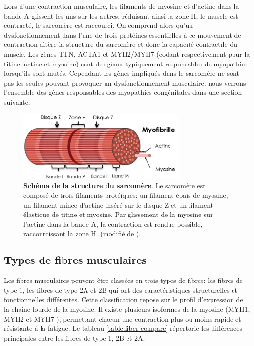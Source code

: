 Lors d'une contraction musculaire, les filaments de myosine et d'actine dans la bande A glissent les uns sur les autres, réduisant ainsi la zone H, le muscle est contracté, le sarcomère est raccourci. On comprend alors qu'un dysfonctionnement dans l'une de trois protéines essentielles à ce mouvement de contraction altère la structure du sarcomère et donc la capacité contractile du muscle. Les gènes TTN, ACTA1 et MYH2/MYH7 (codant respectivement pour la titine, actine et myosine) sont des gènes typiquement responsables de myopathies lorsqu'ils sont mutés. Cependant les gènes impliqués dans le sarcomère ne sont pas les seules pouvant provoquer un dysfonctionnement musculaire, nous verrons l'ensemble des gènes responsables des myopathies congénitales dans une section suivante.

\begin{figure}[htbp]
 \centering
 \includegraphics[width=0.75\textwidth]{figures/sarcomere.png}
 \caption[Schéma de la structure du sarcomère.]{\textbf{Schéma de la structure du sarcomère}. Le sarcomère est composé de trois filaments protéiques: un filament épais de myosine, un filament mince d'actine inséré sur le disque Z et un filament élastique de titine et myosine. Par glissement de la myosine sur l'actine dans la bande A, la contraction est rendue possible, raccourcissant la zone H. (modifié de \cite{burr_basic_2019}).}
 \label{fig:sarcomere}
\end{figure}

\subsection{Types de fibres musculaires}
Les fibres musculaires peuvent être classées en trois types de fibres: les fibres de type 1, les fibres de type 2A et 2B qui ont des caractéristiques structurelles et fonctionnelles différentes. Cette classification repose sur le profil d'expression de la chaine lourde de la myosine. Il existe plusieurs isoformes de la myosine (MYH1, MYH2 et MYH7 \cite{tajsharghi_myosinopathies_2013}), permettant chacun une contraction plus ou moins rapide et résistante à la fatigue. Le tableau \ref{table:fiber-compare} répertorie les différences principales entre les fibres de type 1, 2B et 2A.

